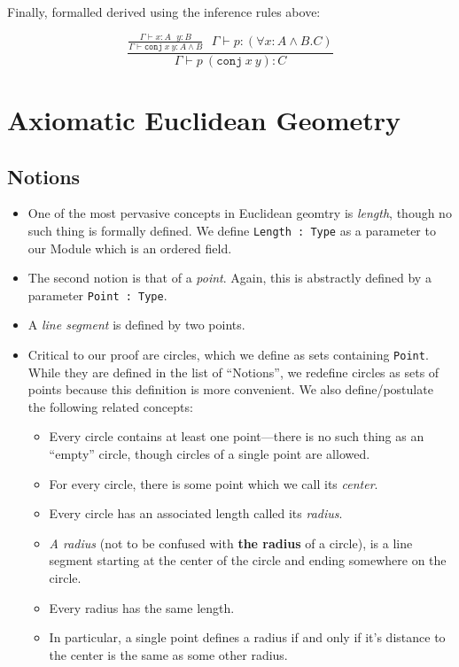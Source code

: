 \documentclass[10pt]{article}
\newcommand{\coq}[1]{\texttt{#1}}
\begin{document}
Finally, formalled derived using the inference rules above:

\begin{equation*}
    \frac{\frac{\Gamma \vdash x : A~~~y : B}{\Gamma \vdash \mathtt{conj}~x~y : A \wedge B}~~~\Gamma \vdash p : (\forall x : A \wedge B.C)}{\Gamma \vdash p~(\mathtt{conj}~x~y) : C}
\end{equation*}

\section{Axiomatic Euclidean Geometry}
\subsection{Notions}

\begin{itemize}
    \item One of the most pervasive concepts in Euclidean geomtry is \textit{length}, though no such thing is formally defined.
        We define \coq{Length : Type} as a parameter to our Module which is an ordered field.

    \item The second notion is that of a \textit{point}.
        Again, this is abstractly defined by a parameter \coq{Point : Type}.

    \item A \textit{line segment} is defined by two points.

    \item Critical to our proof are circles, which we define as sets containing \coq{Point}.
        While they are defined in the list of ``Notions'', we redefine circles as sets of points because this definition is more convenient.
        We also define/postulate the following related concepts:
        \begin{itemize}
            \item Every circle contains at least one point---there is no such thing as an ``empty'' circle, though circles of a single point are allowed.
            \item For every circle, there is some point which we call its \textit{center}.
            \item Every circle has an associated length called its \textit{radius}.
            \item \textit{A radius} (not to be confused with \textbf{the radius} of a circle), is a line segment starting at the center of the circle and ending somewhere on the circle.
            \item Every radius has the same length.
            \item In particular, a single point defines a radius if and only if it's distance to the center is the same as some other radius.
        \end{itemize}


\end{itemize}
\end{document}
